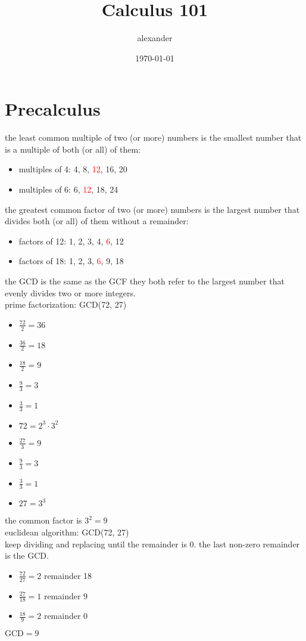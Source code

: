 \documentclass{article}
\title{Calculus 101}
\author{alexander}
\date{\today}
\begin{document}
\maketitle

\section*{Precalculus}

the least common multiple of two (or more) numbers is the smallest number that is a multiple of both (or all) of them:
	\begin{itemize}
		\item multiples of 4: 4, 8, \textcolor{red}{12}, 16, 20
		\item multiples of 6: 6, \textcolor{red}{12}, 18, 24
	\end{itemize}

the greatest common factor of two (or more) numbers is the largest number that divides both (or all) of them without a remainder:
	\begin{itemize}
		\item factors of 12: 1, 2, 3, 4, \textcolor{red}{6}, 12
		\item factors of 18: 1, 2, 3, \textcolor{red}{6}, 9, 18
	\end{itemize}

the GCD is the same as the GCF they both refer to the largest number that evenly divides two or more integers.\\

prime factorization: GCD(72, 27)
	\begin{itemize}
		\item $\frac{72}{2} = 36$
		\item $\frac{36}{2} = 18$ 
		\item $\frac{18}{2} = 9$ 
		\item $\frac{9}{3} = 3$ 
		\item $\frac{3}{3} = 1$ 
		\item $72 = 2^3 \cdot 3^2$ 
		\item $\frac{27}{3} = 9$ 
		\item $\frac{9}{3} = 3$ 
		\item $\frac{3}{3} = 1$ 
		\item $27 = 3^3$ 
	\end{itemize}
the common factor is $3^2 = 9$\\

euclidean algorithm: GCD(72, 27)\\
keep dividing and replacing until the remainder is 0. the last non-zero remainder is the GCD.
	\begin{itemize}
		\item $\frac{72}{27} = 2$ remainder 18
		\item $\frac{27}{18} = 1$ remainder 9
		\item $\frac{18}{9} = 2$ remainder 0
	\end{itemize}
$\text{GCD} = 9$\\
\end{document}
